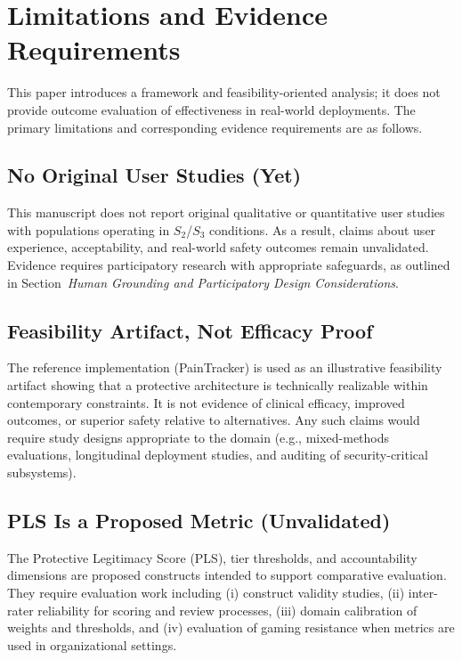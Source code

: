\documentclass[12pt]{article}
\begin{document}
\section{Limitations and Evidence Requirements}

This paper introduces a framework and feasibility-oriented analysis; it does not provide outcome evaluation of effectiveness in real-world deployments. The primary limitations and corresponding evidence requirements are as follows.

\subsection{No Original User Studies (Yet)}
This manuscript does not report original qualitative or quantitative user studies with populations operating in $S_2$/$S_3$ conditions. As a result, claims about user experience, acceptability, and real-world safety outcomes remain unvalidated. Evidence requires participatory research with appropriate safeguards, as outlined in Section~\emph{Human Grounding and Participatory Design Considerations}.

\subsection{Feasibility Artifact, Not Efficacy Proof}
The reference implementation (PainTracker) is used as an illustrative feasibility artifact showing that a protective architecture is technically realizable within contemporary constraints. It is not evidence of clinical efficacy, improved outcomes, or superior safety relative to alternatives. Any such claims would require study designs appropriate to the domain (e.g., mixed-methods evaluations, longitudinal deployment studies, and auditing of security-critical subsystems).

\subsection{PLS Is a Proposed Metric (Unvalidated)}
The Protective Legitimacy Score (PLS), tier thresholds, and accountability dimensions are proposed constructs intended to support comparative evaluation. They require evaluation work including (i) construct validity studies, (ii) inter-rater reliability for scoring and review processes, (iii) domain calibration of weights and thresholds, and (iv) evaluation of gaming resistance when metrics are used in organizational settings.
\end{document}
